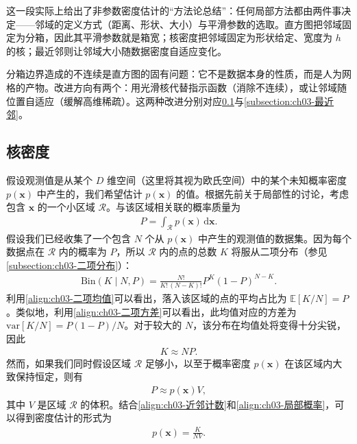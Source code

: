 \documentclass[../../main.tex]{subfiles}
\begin{document}
\begin{remark}
这一段实际上给出了非参数密度估计的“方法论总结”：任何局部方法都由两件事决定——邻域的定义方式（距离、形状、大小）与平滑参数的选取。直方图把邻域固定为分箱，因此其平滑参数就是箱宽；核密度把邻域固定为形状给定、宽度为 $h$ 的核；最近邻则让邻域大小随数据密度自适应变化。

分箱边界造成的不连续是直方图的固有问题：它不是数据本身的性质，而是人为网格的产物。改进方向有两个：用光滑核代替指示函数（消除不连续），或让邻域随位置自适应（缓解高维稀疏）。这两种改进分别对应\cref{subsection:ch03-核密度}与\cref{subsection:ch03-最近邻}。
\end{remark}

\subsection{核密度}\label{subsection:ch03-核密度}

假设观测值是从某个 $D$ 维空间（这里将其视为欧氏空间）中的某个未知概率密度 $p(\boldsymbol{x})$ 中产生的，我们希望估计 $p(\boldsymbol{x})$ 的值。根据先前关于局部性的讨论，考虑包含 $\boldsymbol{x}$ 的一个小区域 $\mathcal{R}$。与该区域相关联的概率质量为
\begin{align}
P=\int_{\mathcal{R}}p(\boldsymbol{x})\,\mathrm{d}\boldsymbol{x}.
\label{align:ch03-区域概率}
\end{align}
假设我们已经收集了一个包含 $N$ 个从 $p(\boldsymbol{x})$ 中产生的观测值的数据集。因为每个数据点在 $\mathcal{R}$ 内的概率为 $P$，所以 $\mathcal{R}$ 内的点的总数 $K$ 将服从二项分布（参见\cref{subsection:ch03-二项分布}）：
\begin{align}
\mathrm{Bin}(K\mid N,P)=\frac{N!}{K!\,(N-K)!}P^{K}(1-P)^{N-K}.
\label{align:ch03-区域二项}
\end{align}
利用\eqref{align:ch03-二项均值}可以看出，落入该区域的点的平均占比为 $\mathbb{E}[K/N]=P$。类似地，利用\eqref{align:ch03-二项方差}可以看出，此均值对应的方差为 $\mathrm{var}[K/N]=P(1-P)/N$。对于较大的 $N$，该分布在均值处将变得十分尖锐，因此
\begin{align}
K\approx NP.
\label{align:ch03-近邻计数}
\end{align}
然而，如果我们同时假设区域 $\mathcal{R}$ 足够小，以至于概率密度 $p(\boldsymbol{x})$ 在该区域内大致保持恒定，则有
\begin{align}
P\approx p(\boldsymbol{x})V,
\label{align:ch03-局部概率}
\end{align}
其中 $V$ 是区域 $\mathcal{R}$ 的体积。结合\eqref{align:ch03-近邻计数}和\eqref{align:ch03-局部概率}，可以得到密度估计的形式为
\begin{align}
p(\boldsymbol{x})=\frac{K}{NV}.
\label{align:ch03-局部密度}
\end{align}
\end{document}
